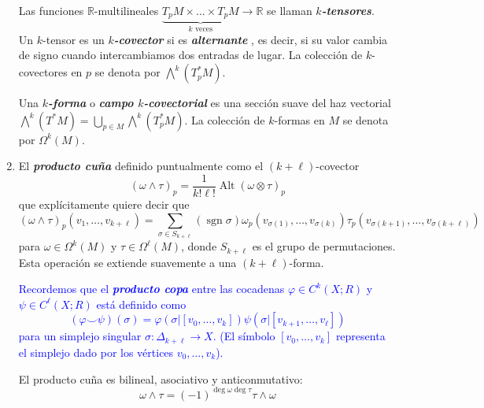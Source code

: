 \documentclass[spanish]{article}
\theoremstyle{definition}
\newcommand{\R}{\mathbb{R}}
\DeclareMathOperator{\sgn}{sgn}
\begin{document}
\begin{enumerate}
		Las funciones $\R$-multilineales $\underbrace{T_pM\times\ldots\times T_pM}_{k\text{ veces}}\to \R$ se llaman \textbf{\textit{$k$-tensores}}. \\Un $k$-tensor es un \textbf{\textit{$k$-covector}} si es \textbf{\textit{alternante}}
		, es decir, si su valor cambia de signo cuando intercambiamos dos entradas de lugar. La colección de $k$-covectores en $p$ se denota por $\bigwedge^k(T^*_pM)$.
		
		Una \textbf{\textit{$k$-forma}} o \textbf{\textit{campo $k$-covectorial}} es una
		sección suave del haz vectorial $\bigwedge^k(T^*M)=\bigcup_{p\in M}\bigwedge^k(T_p^*M)$.  La colección de $k$-formas en $M$ se denota por $\Omega^k(M)$.
		
		
		\item El \textbf{\textit{producto cuña}} definido puntualmente como el $(k+\ell)$-covector
		\[(\omega\wedge\tau)_p=\frac{1}{k!\ell!}\operatorname{Alt}(\omega\otimes\tau)_p\]
		que explícitamente quiere decir que
		\[(\omega\wedge\tau)_p(v_1,\ldots,v_{k+\ell})=\sum_{\sigma\in S_{k+\ell}}(\sgn\sigma)\omega_p(v_{\sigma(1)},\ldots,v_{\sigma(k)})\tau_p(v_{\sigma(k+1)},\ldots,v_{\sigma(k+\ell)})\]
		para $\omega\in\Omega^k(M)$ y $\tau\in\Omega^\ell(M)$, donde $S_{k+\ell}$ es el grupo de permutaciones. Esta operación se extiende suavemente a una $(k+\ell)$-forma.
		
		\textcolor{blue}{Recordemos que el \textbf{\textit{producto copa}} entre las cocadenas $\varphi\in C^k(X;R)$ y $\psi\in C^\ell(X;R)$ está definido como
			\[(\varphi\smile \psi)(\sigma)=\varphi(\sigma|[v_0,\ldots,v_k])\psi(\sigma|[v_{k+1},\ldots,v_{\ell}])\]
			para un simplejo singular $\sigma:\Delta_{k+\ell}\to X$. (El símbolo $[v_0,\ldots,v_k]$ representa el simplejo dado por los vértices $v_0,\ldots,v_k$).
		}
		
		El producto cuña es bilineal, asociativo y anticonmutativo:
		\[\omega\wedge\tau=(-1)^{\deg\omega\deg\tau}\tau\wedge\omega\]
		

\end{enumerate}
\end{document}
